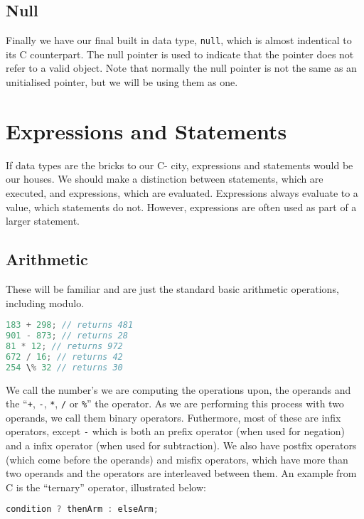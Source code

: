 \subsection{Null}

Finally we have our final built in data type, \verb+null+, which is almost indentical to its C counterpart. The null pointer is used to indicate that the pointer does not refer to a valid object. Note that normally the null pointer is not the same as an unitialised pointer, but we will be using them as one. 

\section{Expressions and Statements}

If data types are the bricks to our C- city, expressions and statements would be our houses. We should make a distinction between statements, which are executed, and expressions, which are evaluated. Expressions always evaluate to a value, which statements do not. However, expressions are often used as part of a larger statement.

\subsection{Arithmetic}

These will be familiar and are just the standard basic arithmetic operations, including modulo.

\begin{lstlisting}[language=C]
183 + 298; // returns 481
901 - 873; // returns 28
81 * 12; // returns 972 
672 / 16; // returns 42
254 \% 32 // returns 30
\end{lstlisting}

We call the number's we are computing the operations upon, the operands and the ``\verb-+-, \verb+-+, \verb+*+, \verb+/+ or \verb+%+'' the operator. As we are performing this process with two operands, we call them binary operators. Futhermore, most of these are infix operators, except \verb+-+ which is both an prefix operator (when used for negation) and a infix operator (when used for subtraction). We also have postfix operators (which come before the operands) and misfix operators, which have more than two operands and the operators are interleaved between them. An example from C is the ``ternary'' operator, illustrated below:

\begin{lstlisting}[language=C]
condition ? thenArm : elseArm;
\end{lstlisting}

